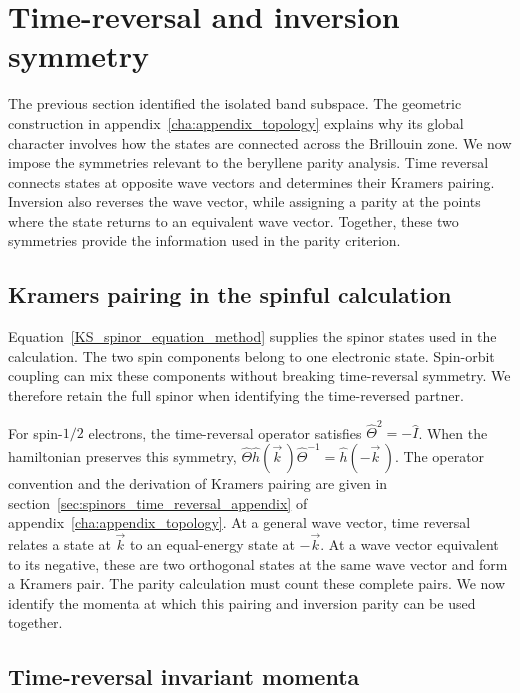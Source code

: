 \newpage
\FloatBarrier
\section{Time-reversal and inversion symmetry}
\label{sec:symmetry_and_kramers_pairs_topology}

The previous section identified the isolated band subspace.
The geometric construction in appendix~\ref{cha:appendix_topology} explains why its global character involves how the states are connected across the Brillouin zone.
We now impose the symmetries relevant to the beryllene parity analysis.
Time reversal connects states at opposite wave vectors and determines their Kramers pairing.
Inversion also reverses the wave vector, while assigning a parity at the points where the state returns to an equivalent wave vector.
Together, these two symmetries provide the information used in the parity criterion.

\FloatBarrier
\subsection{Kramers pairing in the spinful calculation}

Equation~\eqref{KS_spinor_equation_method} supplies the spinor states used in the calculation.
The two spin components belong to one electronic state.
Spin-orbit coupling can mix these components without breaking time-reversal symmetry.
We therefore retain the full spinor when identifying the time-reversed partner.

For spin-$1/2$ electrons, the time-reversal operator satisfies $\hat{\Theta}^2=-\hat{I}$.
When the hamiltonian preserves this symmetry,
$\hat{\Theta}\hat{h}(\vec{k}\,)\hat{\Theta}^{-1}=\hat{h}(-\vec{k}\,)$.
The operator convention and the derivation of Kramers pairing are given in section~\ref{sec:spinors_time_reversal_appendix} of appendix~\ref{cha:appendix_topology}.
At a general wave vector, time reversal relates a state at $\vec{k}$ to an equal-energy state at $-\vec{k}$.
At a wave vector equivalent to its negative, these are two orthogonal states at the same wave vector and form a Kramers pair.
The parity calculation must count these complete pairs.
We now identify the momenta at which this pairing and inversion parity can be used together.

\FloatBarrier
\subsection{Time-reversal invariant momenta}
\label{subsec:trim_topology}

